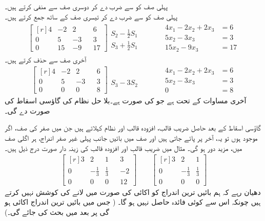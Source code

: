 پہلی صف کو  سے ضرب دے کر دوسری صف سے منفی کرتے ہیں۔\\
پہلی صف کو  سے ضرب دے کر تیسری صف کے ساتھ جمع کرتے ہیں۔
\begin{gather*}
\begin{bmatrix*}[r] 4&-2&2&&6\\0&5&-3&&3\\0&15&-9&&17  \end{bmatrix*}\begin{matrix}\\S_2-\frac{1}{2}S_1\\S_3+\frac{1}{2}S_1  \end{matrix}\quad \quad \quad 
\begin{aligned}
4x_1-2x_2+2x_3&=6\\
5x_2-3x_3&=3\\
15x_2-9x_3&=17
\end{aligned}
\end{gather*}
آخری صف سے  حذف کرتے ہیں۔
\begin{gather*}
\begin{bmatrix*}[r] 4&-2&2&&6\\0&5&-3&&3\\0&0&0&&8  \end{bmatrix*}\begin{matrix}\\\\S_3-3S_2  \end{matrix}\quad \quad \quad 
\begin{aligned}
4x_1-2x_2+2x_3&=6\\
5x_2-3x_3&=3\\
0&=8
\end{aligned}
\end{gather*}
آخری مساوات کے تحت  ہے جو  کی صورت ہے۔بلا حل نظام کی گاؤسی اسقاط  کی صورت دے گی۔

گاؤسی اسقاط کے بعد حاصل  ضریب  قالب، افزودہ قالب اور نظام   کہلاتے ہیں جن میں صفر کی صف، اگر موجود ہوں تو یہ،  آخر پر پائے جاتی ہیں اور صف میں بائیں جانب پہلی غیر صفر اندراج، ہر اگلی صف میں، مزید دور ہو گی۔ مثال  میں  ضریب  قالب اور افزودہ قالب کی زینہ دار صورت درج ذیل ہیں۔
\begin{align*}
\begin{bmatrix*}[r] 3&2&1&&3\\0&-\frac{1}{3}&\frac{1}{3}&&-2\\0&0&0&&12  \end{bmatrix*} \quad \quad \begin{bmatrix*}[r] 3&2&1\\0&-\frac{1}{3}&\frac{1}{3}\\0&0&0 \end{bmatrix*}
\end{align*}
دھیان رہے کہ ہم بائیں ترین اندراج کو اکائی  کی صورت میں لانے کی کوشش نہیں کرتے ہیں چونکہ اس سے کوئی فائدہ حاصل نہیں ہو گا۔  ( جس میں بائیں ترین اندراج اکائی ہو گی پر بعد میں بحث کی جائے گی۔)

